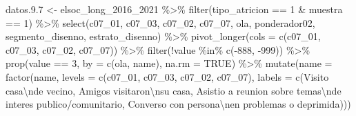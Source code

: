 \documentclass[
  12pt,
]{book}
\newenvironment{Shaded}{\begin{snugshade}}{\end{snugshade}}
\newcommand{\AttributeTok}[1]{\textcolor[rgb]{0.77,0.63,0.00}{#1}}
\newcommand{\ConstantTok}[1]{\textcolor[rgb]{0.00,0.00,0.00}{#1}}
\newcommand{\DecValTok}[1]{\textcolor[rgb]{0.00,0.00,0.81}{#1}}
\newcommand{\FloatTok}[1]{\textcolor[rgb]{0.00,0.00,0.81}{#1}}
\newcommand{\FunctionTok}[1]{\textcolor[rgb]{0.00,0.00,0.00}{#1}}
\newcommand{\NormalTok}[1]{#1}
\newcommand{\OtherTok}[1]{\textcolor[rgb]{0.56,0.35,0.01}{#1}}
\newcommand{\SpecialCharTok}[1]{\textcolor[rgb]{0.00,0.00,0.00}{#1}}
\newcommand{\StringTok}[1]{\textcolor[rgb]{0.31,0.60,0.02}{#1}}
\begin{document}
\begin{Shaded}
\begin{Highlighting}[]
\NormalTok{datos.}\FloatTok{9.7} \OtherTok{\textless{}{-}}\NormalTok{ elsoc\_long\_2016\_2021 }\SpecialCharTok{\%\textgreater{}\%} 
  \FunctionTok{filter}\NormalTok{(tipo\_atricion }\SpecialCharTok{==} \DecValTok{1} \SpecialCharTok{\&}\NormalTok{ muestra }\SpecialCharTok{==} \DecValTok{1}\NormalTok{) }\SpecialCharTok{\%\textgreater{}\%}  
  \FunctionTok{select}\NormalTok{(c07\_01, c07\_03, c07\_02, c07\_07, ola, ponderador02, segmento\_disenno, estrato\_disenno) }\SpecialCharTok{\%\textgreater{}\%} 
  \FunctionTok{pivot\_longer}\NormalTok{(}\AttributeTok{cols =} \FunctionTok{c}\NormalTok{(c07\_01, c07\_03, c07\_02, c07\_07)) }\SpecialCharTok{\%\textgreater{}\%} 
  \FunctionTok{filter}\NormalTok{(}\SpecialCharTok{!}\NormalTok{value }\SpecialCharTok{\%in\%} \FunctionTok{c}\NormalTok{(}\SpecialCharTok{{-}}\DecValTok{888}\NormalTok{, }\SpecialCharTok{{-}}\DecValTok{999}\NormalTok{)) }\SpecialCharTok{\%\textgreater{}\%} 
  \FunctionTok{prop}\NormalTok{(value }\SpecialCharTok{==} \DecValTok{3}\NormalTok{, }\AttributeTok{by =} \FunctionTok{c}\NormalTok{(ola, name), }\AttributeTok{na.rm =} \ConstantTok{TRUE}\NormalTok{) }\SpecialCharTok{\%\textgreater{}\%} 
  \FunctionTok{mutate}\NormalTok{(}\AttributeTok{name =} \FunctionTok{factor}\NormalTok{(name,}
                       \AttributeTok{levels =} \FunctionTok{c}\NormalTok{(}\StringTok{\textquotesingle{}c07\_01\textquotesingle{}}\NormalTok{, }\StringTok{\textquotesingle{}c07\_03\textquotesingle{}}\NormalTok{, }\StringTok{\textquotesingle{}c07\_02\textquotesingle{}}\NormalTok{, }\StringTok{\textquotesingle{}c07\_07\textquotesingle{}}\NormalTok{),}
                       \AttributeTok{labels =} \FunctionTok{c}\NormalTok{(}\StringTok{\textquotesingle{}Visito casa}\SpecialCharTok{\textbackslash{}n}\StringTok{de vecino\textquotesingle{}}\NormalTok{,}
                               \StringTok{\textquotesingle{}Amigos visitaron}\SpecialCharTok{\textbackslash{}n}\StringTok{su casa\textquotesingle{}}\NormalTok{,}
                               \StringTok{\textquotesingle{}Asistio a reunion sobre temas}\SpecialCharTok{\textbackslash{}n}\StringTok{de interes publico/comunitario\textquotesingle{}}\NormalTok{,}
                               \StringTok{\textquotesingle{}Converso con persona}\SpecialCharTok{\textbackslash{}n}\StringTok{en problemas o deprimida\textquotesingle{}}\NormalTok{)))}


\end{Highlighting}
\end{Shaded}
\end{document}
